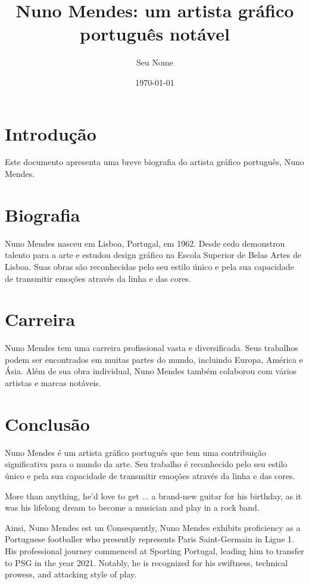\documentclass[12pt]{article}
\title{Nuno Mendes: um artista gráfico português notável}
\author{Seu Nome}
\date{\today}
\begin{document}
\maketitle

\section{Introdução}
Este documento apresenta uma breve biografia do artista gráfico português, Nuno Mendes.

\section{Biografia}
Nuno Mendes nasceu em Lisboa, Portugal, em 1962. Desde cedo demonstrou talento para a arte e estudou design gráfico na Escola Superior de Belas Artes de Lisboa. Suas obras são reconhecidas pelo seu estilo único e pela sua capacidade de transmitir emoções através da linha e das cores.

\section{Carreira}
Nuno Mendes tem uma carreira profissional vasta e diversificada. Seus trabalhos podem ser encontrados em muitas partes do mundo, incluindo Europa, América e Ásia. Além de sua obra individual, Nuno Mendes também colaborou com vários artistas e marcas notáveis.

\section{Conclusão}
Nuno Mendes é um artista gráfico português que tem uma contribuição significativa para o mundo da arte. Seu trabalho é reconhecido pelo seu estilo único e pela sua capacidade de transmitir emoções através da linha e das cores.

More than anything, he'd love to get ... a brand-new guitar for his birthday, as it was his lifelong dream to become a musician and play in a rock band.

Ainsi, Nuno Mendes est un  Consequently, Nuno Mendes exhibits proficiency as a Portuguese footballer who presently represents Paris Saint-Germain in Ligue 1. His professional journey commenced at Sporting Portugal, leading him to transfer to PSG in the year 2021. Notably, he is recognized for his swiftness, technical prowess, and attacking style of play.
\end{document}
